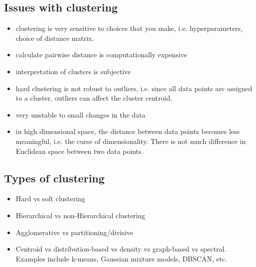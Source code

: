 \documentclass[12pt,a4paper]{article}
\begin{document}
\subsection{Issues with clustering}
\begin{itemize}
    \item clustering is very sensitive to choices that you make, i.e. hyperparameters, choice of distance matrix.
    \item calculate pairwise distance is computationally expensive
    \item interpretation of clusters is subjective
    \item hard clustering is not robust to outliers, i.e. since all data points are assigned to a cluster, outliers can affect the cluster centroid.
    \item very unstable to small changes in the data
    \item in high dimensional space, the distance between data points becomes less meaningful, i.e. the curse of dimensionality. There is not much difference in Euclidean space between two data points.
\end{itemize}

\subsection{Types of clustering}
\begin{itemize}
    \item Hard vs soft clustering
    \item Hierarchical vs non-Hierarchical clustering
    \item Agglomerative vs partitioning/divisive
    \item Centroid vs distribution-based vs density vs graph-based vs spectral. Examples include k-means, Gaussian mixture models, DBSCAN, etc.
\end{itemize}
\end{document}
